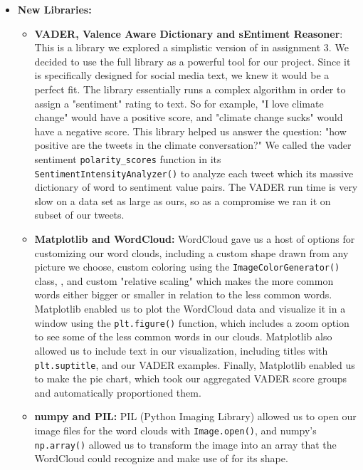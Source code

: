 \documentclass[fontsize=11pt]{article}
\begin{document}
\begin{itemize}
    \item \textbf{New Libraries:}
    \begin{itemize}
        \item \textbf{VADER, Valence Aware Dictionary and sEntiment Reasoner}: This is a library we explored a simplistic version of in assignment 3. We decided to use the full library as a powerful tool for our project. Since it is specifically designed for social media text, we knew it would be a perfect fit. The library essentially runs a complex algorithm in order to assign a "sentiment" rating to text. So for example, "I love climate change" would have a positive score, and "climate change sucks" would have a negative score. This library helped us answer the question: "how positive are the tweets in the climate conversation?" We called the 
            vader sentiment \texttt{polarity\_scores} function in its \texttt{SentimentIntensityAnalyzer()} to analyze each tweet which its massive dictionary of word to sentiment value pairs. The VADER run time is very slow on a data set as large as ours, so as a compromise we ran it on subset of our tweets.
        \item \textbf{Matplotlib and WordCloud:} WordCloud gave us a host of options for customizing our word clouds, including a custom shape drawn from any picture we choose, custom coloring using the \texttt{ImageColorGenerator()} class, , and custom "relative scaling" which makes the more common words either bigger or smaller in relation to the less common words. Matplotlib enabled us to plot the WordCloud data and visualize it in a window using the \texttt{plt.figure()} function, which includes a zoom option to see some of the less common words in our clouds. Matplotlib also allowed us to include text in our visualization, including titles with \texttt{plt.suptitle}, and our VADER examples. Finally, Matplotlib enabled us to make the pie chart, which took our aggregated VADER score groups and automatically proportioned them.
        \item \textbf{numpy and PIL:} PIL (Python Imaging Library) allowed us to open our image files for the word clouds with \texttt{Image.open()}, and numpy's \texttt{np.array()} allowed us to transform the image into an array that the WordCloud could recognize and make use of for its shape.
    \end{itemize}

\end{itemize}
\end{document}
